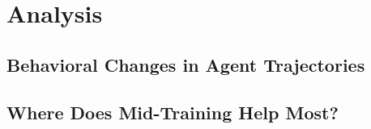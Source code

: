 \documentclass{article}
\begin{document}
\section{Analysis}
\label{sec:analysis}


%
\subsection{Behavioral Changes in Agent Trajectories}
\label{sec:analysis:behavior}



%
\subsection{Where Does Mid-Training Help Most?}
\label{sec:analysis:failure}
\end{document}
